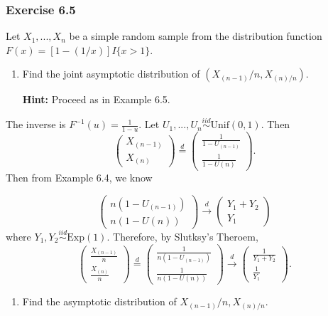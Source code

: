 \documentclass[12pt,]{article}
\providecommand{\tightlist}{%
  \setlength{\itemsep}{0pt}\setlength{\parskip}{0pt}}
\begin{document}
\hypertarget{exercise-6.5}{%
\subsubsection{Exercise 6.5}\label{exercise-6.5}}

Let \(X_1,...,X_n\) be a simple random sample from the distribution
function \(F(x)=[1-(1/x)]I\{x>1\}\).

\begin{enumerate}
\def\labelenumi{(\alph{enumi})}
\item
  Find the joint asymptotic distribution of \((X_{(n-1)}/n,X_{(n)/n}).\)

  \textbf{Hint:} Proceed as in Example 6.5.
\end{enumerate}

The inverse is \(F^{-1}(u)=\frac{1}{1-u}.\) Let
\(U_1,...,U_n\overset{iid}\sim \text{Unif}(0,1).\) Then
\[\begin{pmatrix} X_{(n-1)} \\ X_{(n)}\end{pmatrix} \overset{d}= \begin{pmatrix} \frac{1}{1-U_{(n-1)}} \\ \frac{1}{1-U{(n)}}\end{pmatrix}.\]
Then from Example 6.4, we know

\[\begin{pmatrix} n(1-U_{(n-1)}) \\ n(1-U{(n)})\end{pmatrix}\overset{d}\rightarrow \begin{pmatrix} Y_1+Y_2 \\ Y_1\end{pmatrix}\]
where \(Y_1, Y_2 \overset{iid}\sim \text{Exp}(1).\) Therefore, by
Slutksy's Theroem,
\[\begin{pmatrix} \frac{X_{(n-1)}}{n} \\ \frac{X_{(n)}}{n}\end{pmatrix} \overset{d}= \begin{pmatrix} \frac{1}{n(1-U_{(n-1)})} \\ \frac{1}{n(1-U{(n)})}\end{pmatrix}\overset{d}\rightarrow \begin{pmatrix} \frac{1}{Y_1+Y_2} \\ \frac{1}{Y_1}\end{pmatrix}.\]

\begin{enumerate}
\def\labelenumi{(\alph{enumi})}
\setcounter{enumi}{1}
\tightlist
\item
  Find the asymptotic distribution of \(X_{(n-1)}/n,X_{(n)/n}\).
\end{enumerate}
\end{document}
